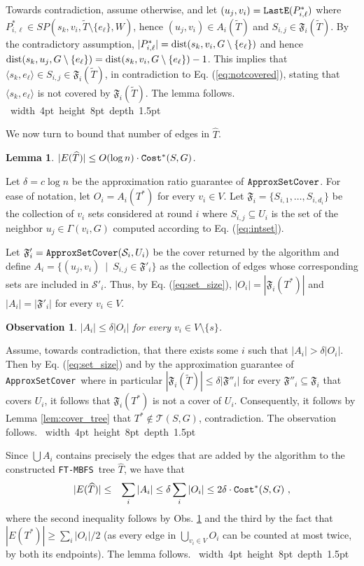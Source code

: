 \documentclass[12pt]{article}
\newtheorem{lemma}[theorem]{Lemma}
\newtheorem{observation}[theorem]{Observation}
\def\Set{\mathfrak{F}}
\def\Cost{\mbox{\tt Cost}}
\newcommand{\dist}{\mbox{\rm dist}}
\def\Proof{\par\noindent{\bf Proof:~}}
\def\blackslug{\hbox{\hskip 1pt \vrule width 4pt height 8pt
    depth 1.5pt \hskip 1pt}}
\def\QED{\quad\blackslug\lower 8.5pt\null\par}
\def\LastE{\mbox{\tt LastE}}
\def\FTMBFS{\mbox{\tt FT-MBFS}}
\def\ApproxSetCover{\mbox{\tt ApproxSetCover}}
\begin{document}
Towards contradiction, assume otherwise, and let
$(u_j, v_i)=\LastE(P^*_{i,\ell})$
where $P^*_{i,\ell} \in SP(s_k, v_i, \widetilde{T} \setminus \{e_\ell\},W)$,
hence $(u_j, v_i) \in A_i(\widetilde{T})$
and $S_{i,j} \in \Set_i(\widetilde{T})$.
By the contradictory assumption, $|P^*_{i,\ell}|=\dist(s_k, v_i, G \setminus \{e_\ell\})$
and hence $\dist(s_k, u_j, G \setminus \{e_\ell\})=\dist(s_k, v_i, G \setminus \{e_\ell\})-1$.
This implies that $\langle s_k,e_\ell \rangle \in S_{i,j} \in \Set_i(\widetilde{T})$, in contradiction to Eq. (\ref{eq:notcovered}),
stating that $\langle s_k,e_\ell \rangle$ is not covered by $\Set_i(\widetilde{T})$.
The lemma follows.
\QED
We now turn to bound that number of edges in $\widehat{T}$.
\begin{lemma}
\label{lem:numbersize}
$|E(\widehat{T})| \leq O(\log n)\cdot \Cost^*(S, G)$.
\end{lemma}
\Proof
Let $\delta=c\log n$ be the approximation
ratio guarantee of $\ApproxSetCover$.
For ease of notation, let
$O_i=A_i(T^*)$ for every $v_i \in V$.
Let $\Set_i=\{S_{i,1}, \ldots, S_{i,d_i}\}$ be the collection of
$v_i$ sets considered at round $i$ where $S_{i,j}\subseteq U_i$
is the set of the neighbor $u_j \in \Gamma(v_i,G)$ computed according to
Eq. (\ref{eq:intset}).
\par Let $\Set'_i=\ApproxSetCover(\mathcal{S}_i,U_i)$
be the cover returned by the algorithm and define
$A_i=\{(u_j, v_i) ~\mid~ S_{i,j} \in \Set'_i\}$
as the collection of edges whose corresponding sets are included in
$\mathcal{S}'_i$.
Thus, by Eq. (\ref{eq:set_size}),
$|O_i|=|\Set_i(T^*)|$ and $|A_i|=|\Set'_i|$ for every $v_i \in V$.
\begin{observation}
\label{cl:a_i}
$|A_i| \leq \delta |O_i|$ for every $v_i \in V \setminus \{s\}$.
\end{observation}
\Proof
Assume, towards contradiction, that there exists some $i$ such that
$|A_i|>\delta |O_i|$. Then by Eq. (\ref{eq:set_size})
and by the approximation guarantee of \ApproxSetCover\, where in
particular $|\Set_i(\widetilde{T})| \leq \delta |\Set''_i|$
for every $\Set''_i \subseteq  \Set_i$ that covers $U_i$, it follows that $\Set_i(T^*)$ is not a cover of $U_i$.
Consequently, it follows by Lemma \ref{lem:cover_tree}
that $T^* \notin \mathcal{T}(S,G)$, contradiction.
The observation follows.
\QED
Since $\bigcup A_i$ contains precisely the edges that are added by the algorithm to the constructed \FTMBFS\ tree $\widehat{T}$, we have that
\begin{eqnarray*}
|E(\widehat{T})|&\leq& \sum_i |A_i| \leq
\delta \sum_i |O_i| \leq 2\delta \cdot \Cost^*(S, G)~,
\end{eqnarray*}
where the second inequality follows by Obs. \ref{cl:a_i} and
the third by the fact that $|E(T^*)| \geq \sum_i |O_i|/2$ (as every edge in $\bigcup_{v_i \in V} O_i$ can be counted at most twice, by both its endpoints). The lemma follows.
\QED
\end{document}
